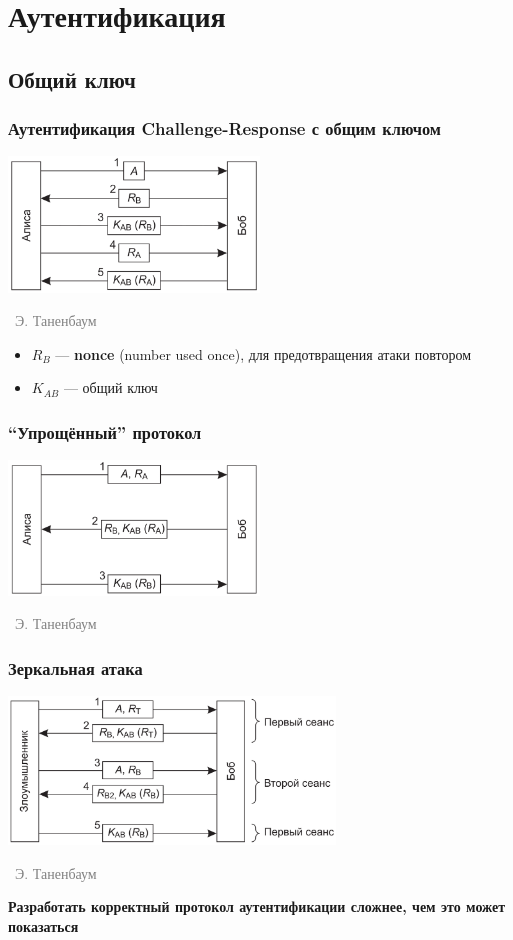 \documentclass[xetex,mathserif,serif]{beamer}
\newcommand{\attribution}[1] {
\vspace{-5mm}\begin{flushright}\begin{scriptsize}\textcolor{gray}{\textcopyright\, #1}\end{scriptsize}\end{flushright}
}
\begin{document}
	\section{Аутентификация}

	\subsection{Общий ключ}

	\begin{frame}
		\frametitle{Аутентификация Challenge-Response с общим ключом}
		\begin{center}
			\includegraphics[width=0.5\textwidth]{challengeResponse.png}
			\attribution{Э. Таненбаум}
		\end{center}
		\begin{itemize}
			\item $R_B$ --- \textbf{nonce} (number used once), для предотвращения атаки повтором
			\item $K_{AB}$ --- общий ключ
		\end{itemize}
	\end{frame}

	\begin{frame}
		\frametitle{``Упрощённый'' протокол}
		\begin{center}
			\includegraphics[width=0.5\textwidth]{simpleChallengeResponse.png}
			\attribution{Э. Таненбаум}
		\end{center}
	\end{frame}

	\begin{frame}
		\frametitle{Зеркальная атака}
		\begin{center}
			\includegraphics[width=0.65\textwidth]{mirrorAttack.png}
			\attribution{Э. Таненбаум}
		\end{center}
		\vspace{5mm}
		\textbf{Разработать корректный протокол аутентификации сложнее, чем это может показаться}
	\end{frame}
\end{document}
